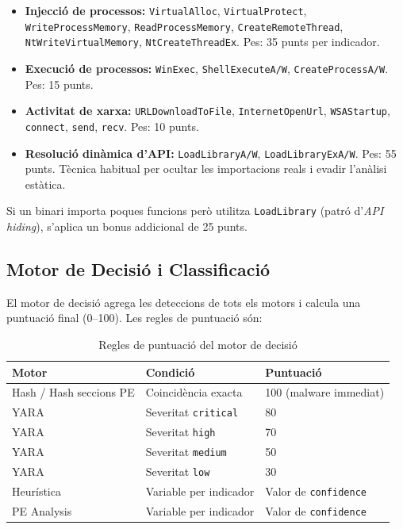 \documentclass[12pt,a4paper]{report}
\begin{document}
\begin{itemize}
    \item \textbf{Injecció de processos:} \texttt{VirtualAlloc}, \texttt{VirtualProtect}, \texttt{WriteProcessMemory}, \texttt{ReadProcessMemory}, \texttt{CreateRemoteThread}, \texttt{NtWriteVirtualMemory}, \texttt{NtCreateThreadEx}. Pes: 35 punts per indicador.
    \item \textbf{Execució de processos:} \texttt{WinExec}, \texttt{ShellExecuteA/W}, \texttt{CreateProcessA/W}. Pes: 15 punts.
    \item \textbf{Activitat de xarxa:} \texttt{URLDownloadToFile}, \texttt{InternetOpenUrl}, \texttt{WSAStartup}, \texttt{connect}, \texttt{send}, \texttt{recv}. Pes: 10 punts.
    \item \textbf{Resolució dinàmica d'API:} \texttt{LoadLibraryA/W}, \texttt{LoadLibraryExA/W}. Pes: 55 punts. Tècnica habitual per ocultar les importacions reals i evadir l'anàlisi estàtica.
\end{itemize}

Si un binari importa poques funcions però utilitza \texttt{LoadLibrary} (patró d'\textit{API hiding}), s'aplica un bonus addicional de 25 punts.

\subsection{Motor de Decisió i Classificació}
El motor de decisió agrega les deteccions de tots els motors i calcula una puntuació final (0--100). Les regles de puntuació són:

\begin{table}[H]
\centering
\caption{Regles de puntuació del motor de decisió}
\label{tab:scoring}
\begin{tabular}{@{}lll@{}}
\toprule
\textbf{Motor} & \textbf{Condició} & \textbf{Puntuació} \\
\midrule
Hash / Hash seccions PE & Coincidència exacta & 100 (malware immediat) \\
YARA & Severitat \texttt{critical} & 80 \\
YARA & Severitat \texttt{high} & 70 \\
YARA & Severitat \texttt{medium} & 50 \\
YARA & Severitat \texttt{low} & 30 \\
Heurística & Variable per indicador & Valor de \texttt{confidence} \\
PE Analysis & Variable per indicador & Valor de \texttt{confidence} \\
\bottomrule
\end{tabular}
\end{table}
\end{document}
